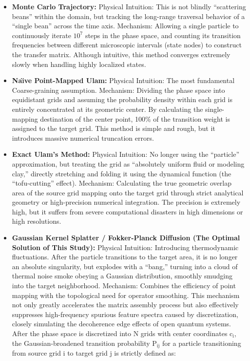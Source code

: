 \documentclass[fractalfract,article,submit,oneauthor,pdftex]{Definitions/mdpi}
\begin{document}
\begin{itemize}
\item
  \textbf{Monte Carlo Trajectory:} Physical Intuition: This is not
  blindly ``scattering beans'' within the domain, but tracking the
  long-range traversal behavior of a ``single bean'' across the time
  axis. Mechanism: Allowing a single particle to continuously iterate
  \(\text{10}^{\text{7}}\) steps in the phase space, and counting its
  transition frequencies between different microscopic intervals (state
  nodes) to construct the transfer matrix. Although intuitive, this
  method converges extremely slowly when handling highly localized
  states.
\item
  \textbf{Na\"\i{}ve Point-Mapped Ulam:} Physical Intuition: The most
  fundamental Coarse-graining assumption. Mechanism: Dividing the phase
  space into equidistant grids and assuming the probability density
  within each grid is entirely concentrated at its geometric center. By
  calculating the single-mapping destination of the center point, 100\%
  of the transition weight is assigned to the target grid. This method
  is simple and rough, but it introduces massive numerical truncation
  errors.
\item
  \textbf{Exact Ulam's Method:} Physical Intuition: No longer using the
  ``particle'' approximation, but treating the grid as ``absolutely
  uniform fluid or modeling clay,'' directly stretching and folding it
  using the dynamical function (the ``tofu-cutting'' effect). Mechanism:
  Calculating the true geometric overlap area of the source grid mapping
  onto the target grid through strict analytical geometry or
  high-precision numerical integration. The precision is extremely high,
  but it suffers from severe computational disasters in high dimensions
  or high resolutions.
\item
  \textbf{Gaussian Kernel Splatter / Fokker-Planck Diffusion (The
  Optimal Solution of This Study):} Physical Intuition: Introducing
  thermodynamic fluctuations. After the particle transitions to the
  target area, it is no longer an absolute singularity, but explodes
  with a ``bang,'' turning into a cloud of thermal noise smoke obeying a
  Gaussian distribution, smoothly smudging into the target neighborhood.
  Mechanism: Combines the efficiency of point mapping with the
  topological need for operator smoothing. This mechanism not only
  greatly accelerates the matrix assembly process but also effectively
  suppresses high-frequency spurious feature spectra caused by
  discretization, closely simulating the decoherence edge effects of
  open quantum systems. After the phase space is discretized into
  \(\text{N}\) grids with center coordinates \(\text{c}_{\text{i}}\),
  the Gaussian-broadened transition probability \(\text{P}_{\text{ij}}\)
  for a particle transitioning from source grid \(\text{i}\) to target
  grid \(\text{j}\) is strictly defined as:
\end{itemize}
\end{document}
